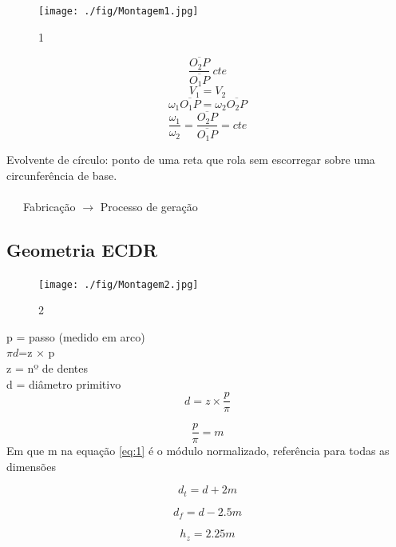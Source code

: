 \documentclass[a4paper, 12pt]{article}
\begin{document}
\begin{figure}[h]
\begin{center}
\texttt{[image: ./fig/Montagem1.jpg]}
\caption{\label{fig:1}1} 
\end{center}
\end{figure}

\[\frac{\overline{O_{2}P}}{\overline{O_{1}P}} \ cte\]
\[V_{1}=V_{2}\]
\[\omega _{1}\overline{O_{1}P} = \omega _{2}\overline{O_{2}P}\]
\[\frac{\omega _{1}}{\omega _{2}} = \frac{\overline{O_{2}P}}{\overline{O_{1}P}} = cte \]

Evolvente de círculo: ponto de uma reta que rola sem escorregar sobre uma circunferência de base.
\\
\\
\ \ \ Fabricação $\rightarrow$ Processo de geração
\\

\subsection{Geometria ECDR}

\begin{figure}[h]
\begin{center}
\texttt{[image: ./fig/Montagem2.jpg]}
\caption{\label{fig:2}2} 
\end{center}
\end{figure}

p = passo (medido em arco) \\
$\pi d$=z $\times$ p \\
z = nº de dentes \\
d = diâmetro primitivo \\

\[d = z \times \frac{p}{\pi} \]

\begin{equation}
\frac{p}{\pi} = m
\label{eq:1}
\end{equation}
Em que m na equação \ref{eq:1} é o módulo normalizado, referência para todas as dimensões

\begin{equation}
d_{t} = d + 2m
\label{eq:2}
\end{equation}

\begin{equation}
d_{f} = d - 2.5m
\label{eq:3}
\end{equation}

\begin{equation}
h_{z} = 2.25m
\label{eq:4}
\end{equation}
\end{document}
